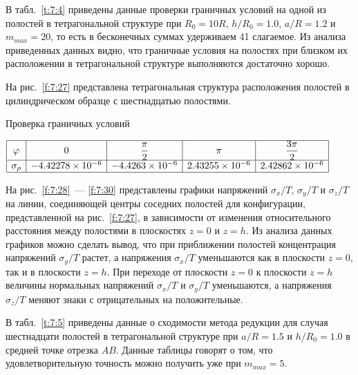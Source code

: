 В табл.~\ref{t:7:4} приведены данные проверки граничных условий на одной из полостей в тетрагональной структуре при $R_0=10R$, $h/R_0=1.0$, $a/R=1.2$ и $m_{max}=20$, то есть в бесконечных суммах удерживаем 41 слагаемое. Из анализа приведенных данных видно, что граничные условия на полостях при близком их расположении в тетрагональной структуре выполняются достаточно хорошо.

На рис.~\ref{f:7:27} представлена тетрагональная структура расположения полостей в цилиндрическом образце с шестнадцатью полостями.

\begin{table}[h!]
\caption{Проверка граничных условий}
\centering
$
\begin{array}{|c|c|c|c|c|}
\hline
\varphi & 0 & \dfrac{\pi}{2} & \pi & \dfrac{3\pi}{2} \\
\hline
\sigma_\rho & -4.42278\times10^{-6} & -4.4263\times10^{-6} & 2.43255\times 10^{-6} & 2.42862\times 10^{-6} \\
\hline
\end{array}
$
\label{t:7:4}
\end{table}

На рис.~\ref{f:7:28}~--- \ref{f:7:30} представлены графики напряжений $\sigma_x/T$, $\sigma_y/T$ и $\sigma_z/T$ на линии, соединяющей центры соседних полостей для конфигурации, представленной на рис.~\ref{f:7:27}, в зависимости от изменения относительного расстояния между полостями в плоскостях $z=0$ и $z=h$. Из анализа данных графиков можно сделать вывод, что при приближении полостей концентрация напряжений $\sigma_y/T$ растет, а напряжения $\sigma_x/T$ уменьшаются как в плоскости $z=0$, так и в плоскости $z=h$. При переходе от плоскости $z=0$ к плоскости $z=h$ величины нормальных напряжений $\sigma_x/T$ и $\sigma_y/T$ уменьшаются, а напряжения $\sigma_z/T$ меняют знаки с отрицательных на положительные.

В табл.~\ref{t:7:5} приведены данные о сходимости метода редукции для случая шестнадцати полостей в тетрагональной структуре при $a/R=1.5$ и $h/R_0=1.0$ в средней точке отрезка $AB$. Данные таблицы говорят о том, что удовлетворительную точность можно получить уже при $m_{max}=5$.

